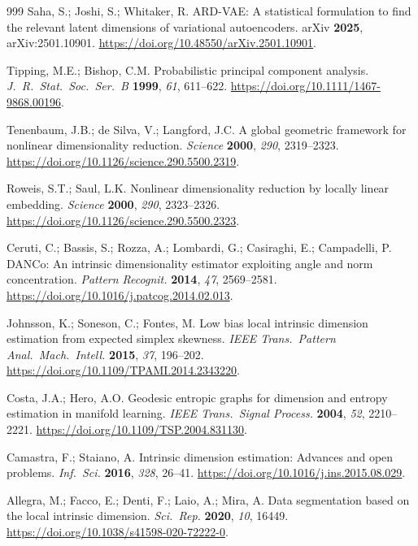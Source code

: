 \documentclass[11pt,a4paper]{ltjsarticle}
\begin{document}
\begin{thebibliography}{999}
Saha, S.; Joshi, S.; Whitaker, R.
ARD-VAE: A statistical formulation to find the relevant latent dimensions
of variational autoencoders.
arXiv \textbf{2025}, arXiv:2501.10901.
\url{https://doi.org/10.48550/arXiv.2501.10901}.

Tipping, M.E.; Bishop, C.M.
Probabilistic principal component analysis.
\textit{J.\ R.\ Stat.\ Soc.\ Ser.\ B} \textbf{1999}, \textit{61}, 611--622.
\url{https://doi.org/10.1111/1467-9868.00196}.

Tenenbaum, J.B.; de Silva, V.; Langford, J.C.
A global geometric framework for nonlinear dimensionality reduction.
\textit{Science} \textbf{2000}, \textit{290}, 2319--2323.
\url{https://doi.org/10.1126/science.290.5500.2319}.

Roweis, S.T.; Saul, L.K.
Nonlinear dimensionality reduction by locally linear embedding.
\textit{Science} \textbf{2000}, \textit{290}, 2323--2326.
\url{https://doi.org/10.1126/science.290.5500.2323}.

Ceruti, C.; Bassis, S.; Rozza, A.; Lombardi, G.; Casiraghi, E.;
Campadelli, P.
DANCo: An intrinsic dimensionality estimator exploiting angle and norm
concentration.
\textit{Pattern Recognit.} \textbf{2014}, \textit{47}, 2569--2581.
\url{https://doi.org/10.1016/j.patcog.2014.02.013}.

Johnsson, K.; Soneson, C.; Fontes, M.
Low bias local intrinsic dimension estimation from expected simplex
skewness.
\textit{IEEE Trans.\ Pattern Anal.\ Mach.\ Intell.} \textbf{2015},
\textit{37}, 196--202. \url{https://doi.org/10.1109/TPAMI.2014.2343220}.

Costa, J.A.; Hero, A.O.
Geodesic entropic graphs for dimension and entropy estimation in manifold
learning.
\textit{IEEE Trans.\ Signal Process.} \textbf{2004}, \textit{52},
2210--2221. \url{https://doi.org/10.1109/TSP.2004.831130}.

Camastra, F.; Staiano, A.
Intrinsic dimension estimation: Advances and open problems.
\textit{Inf.\ Sci.} \textbf{2016}, \textit{328}, 26--41.
\url{https://doi.org/10.1016/j.ins.2015.08.029}.

Allegra, M.; Facco, E.; Denti, F.; Laio, A.; Mira, A.
Data segmentation based on the local intrinsic dimension.
\textit{Sci.\ Rep.} \textbf{2020}, \textit{10}, 16449.
\url{https://doi.org/10.1038/s41598-020-72222-0}.


\end{thebibliography}
\end{document}
